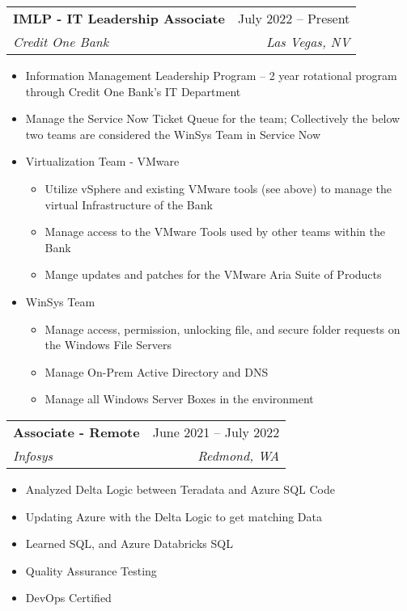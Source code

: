 \documentclass[letterpaper,11pt]{article}
\makeatletter
\newcommand{\resumeItem}[1]{
  \item\small{
    {#1 \vspace{-2pt}}
  }
}
\newcommand{\resumeSubheading}[4]{
  \vspace{-2pt}\item
    \begin{tabular*}{0.97\textwidth}[t]{l@{\extracolsep{\fill}}r}
      \textbf{#1} & #2 \\
      \textit{\small#3} & \textit{\small #4} \\
    \end{tabular*}\vspace{-7pt}
}
\newcommand{\resumeSubSubheading}[2]{
    \item
    \begin{tabular*}{0.97\textwidth}{l@{\extracolsep{\fill}}r}
      \textit{\small#1} & \textit{\small #2} \\
    \end{tabular*}\vspace{-7pt}
}
\newcommand{\resumeSubHeadingListEnd}{\end{itemize}}
\newcommand{\resumeItemListStart}{\begin{itemize}}
\newcommand{\resumeItemListEnd}{\end{itemize}\vspace{-5pt}}
\makeatother
\begin{document}
    \resumeSubheading
      {IMLP - IT Leadership Associate}{July 2022 -- Present}
      {Credit One Bank}{Las Vegas, NV}
      \resumeItemListStart
        \resumeItem{Information Management Leadership Program -- 2 year rotational program through Credit One Bank's IT Department}
        \resumeItem{Manage the Service Now Ticket Queue for the team; Collectively the below two teams are considered the WinSys Team in Service Now}
        \resumeItem{Virtualization Team - VMware}
        \begin{itemize}
           \item Utilize vSphere and existing VMware tools (see above) to manage the virtual Infrastructure of the Bank
           \item Manage access to the VMware Tools used by other teams within the Bank
           \item Mange updates and patches for the VMware Aria Suite of Products
        \end{itemize}
        \resumeItem{WinSys Team}
        \begin{itemize}
           \item Manage access, permission, unlocking file, and secure folder requests on the Windows File Servers
           \item Manage On-Prem Active Directory and DNS
           \item Manage all Windows Server Boxes in the environment
        \end{itemize}
      \resumeItemListEnd

    \resumeSubheading
      {Associate - Remote}{June 2021 -- July 2022}
      {Infosys}{Redmond, WA}
      \resumeItemListStart
        \resumeItem{Analyzed Delta Logic between Teradata and Azure SQL Code}
        \resumeItem{Updating Azure with the Delta Logic to get matching Data}
        \resumeItem{Learned SQL, and Azure Databricks SQL}
        \resumeItem{Quality Assurance Testing}
        \resumeItem{DevOps Certified}
      \resumeItemListEnd

      
\end{document}

